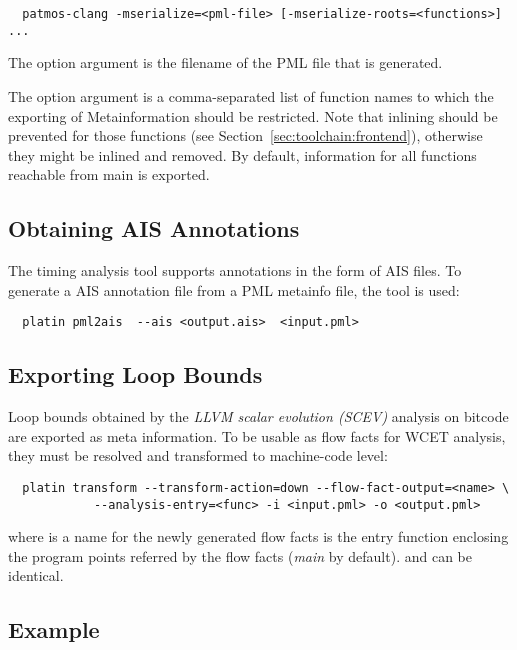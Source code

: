 \begin{verbatim}
  patmos-clang -mserialize=<pml-file> [-mserialize-roots=<functions>] ...
\end{verbatim}

The option argument  is the filename of the PML file that is
generated.

The option argument  is a comma-separated list of function
names to which the exporting of Metainformation should be restricted.
Note that inlining should be prevented for those functions (see
Section~\ref{sec:toolchain:frontend}), otherwise they might be inlined and removed.
By default, information for all functions reachable from main is exported.


\subsection{Obtaining AIS Annotations}

The  timing analysis tool supports annotations in the form of
AIS files.
To generate a AIS annotation file from a PML metainfo file, the
 tool is used:

\begin{verbatim}
  platin pml2ais  --ais <output.ais>  <input.pml>
\end{verbatim}


\subsection{Exporting Loop Bounds}

Loop bounds obtained by the \emph{LLVM scalar evolution (SCEV)} analysis
on bitcode are exported as meta information.
%
To be usable as flow facts for WCET analysis, they must be resolved and
transformed to machine-code level:

\begin{verbatim}
  platin transform --transform-action=down --flow-fact-output=<name> \
            --analysis-entry=<func> -i <input.pml> -o <output.pml>
\end{verbatim}

where  is a name for the newly generated flow facts
\code{<func>} is the entry function enclosing the program points referred by
the flow facts (\emph{main} by default).
%
 and  can be identical.


\subsection{Example}
\label{sec:toolchain:platin:example}


